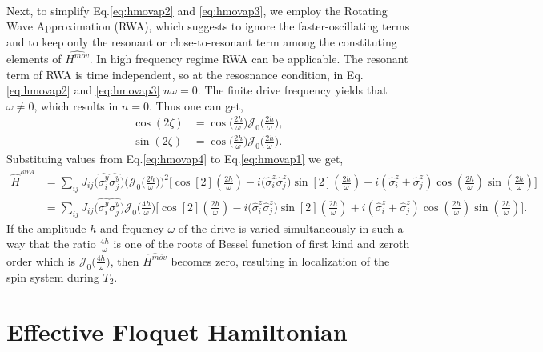 \documentclass[%
reprint,
superscriptaddress,
amsmath,amssymb,showkeys,
aps,
prb,
]{revtex4-2}
\begin{document}
{\begin{align}
		\label{eq:hmovap3}
	\end{align}
	Next, to simplify Eq.\eqref{eq:hmovap2} and \eqref{eq:hmovap3}, we employ the Rotating Wave Approximation (RWA)\cite{Ashhab2007, Kiely2018, haldar_dynamical_2017, das_exotic_2010,fuji2017,haldar_statistical_2022}, which suggests to ignore the faster-oscillating terms and to keep only the resonant or close-to-resonant term among the constituting elements of $\hat{H^{mov}}$. In high frequency regime RWA can be applicable\cite{das_exotic_2010}.
	The resonant term of RWA  is time independent\cite{Ashhab2007}, so at the resosnance condition, in Eq.\eqref{eq:hmovap2} and \eqref{eq:hmovap3}  $n\omega = 0$. The finite drive frequency yields that $\omega \neq 0$, which results in $n=0$. Thus one can get,
	\begin{align}
	\cos(2\zeta) &= \cos\Big(\frac{2h}{\omega}\Big)\mathcal{J}_0\Big(\frac{2h}{\omega}\Big),\nonumber\\
	\sin(2\zeta) &= \cos\Big(\frac{2h}{\omega}\Big)\mathcal{J}_0\Big(\frac{2h}{\omega}\Big). 
	\label{eq:hmovap4}
	\end{align}
	Substituing values from Eq.\eqref{eq:hmovap4} to Eq.\eqref{eq:hmovap1} we get,
	\begin{align}
		\hat{H}^{^{RWA}} &= \sum_{ij} J_{ij} \Big(\hat{\sigma^y_i}\hat{\sigma^y_j}\Big)\Bigg(\mathcal{J}_0\Big(\frac{2h}{\omega}\Big)\Bigg) ^2\Bigg[\cos[2](\frac{2h}{\omega}) -i\Big(\hat{\sigma}^z_i\hat{\sigma}^z_j\Big) \sin[2](\frac{2h}{\omega})+ i (\hat{\sigma}^z_i + \hat{\sigma}^z_j)\cos(\frac{2h}{\omega})\sin(\frac{2h}{\omega})\Bigg]\nonumber\\
		&= \sum_{ij} J_{ij} \Big(\hat{\sigma^y_i}\hat{\sigma^y_j}\Big)\mathcal{J}_0\Big(\frac{4h}{\omega}\Big)\Bigg[\cos[2](\frac{2h}{\omega}) -i\Big(\hat{\sigma}^z_i\hat{\sigma}^z_j\Big) \sin[2](\frac{2h}{\omega})+ i (\hat{\sigma}^z_i + \hat{\sigma}^z_j)\cos(\frac{2h}{\omega})\sin(\frac{2h}{\omega})\Bigg].
	\end{align}
	If the amplitude $h$ and frquency $\omega$ of the drive is varied simultaneously in such a way that the ratio $\frac{4h}{\omega}$ is one of the roots of Bessel function of first kind and zeroth order which is $\mathcal{J}_0\big(\frac{4h}{\omega}\big)$, then $\hat{H^{mov}}$ becomes zero, resulting in localization of the spin system during $T_2$.
}


	\section{\label{AppendixB} Effective Floquet Hamiltonian}
	
\end{document}
